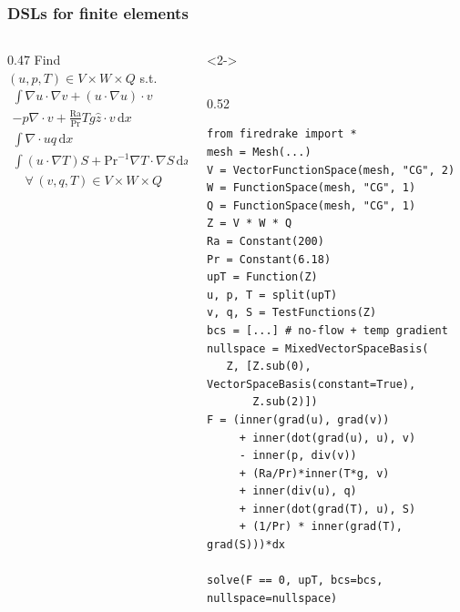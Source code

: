 \documentclass[presentation]{beamer}
\begin{document}
\begin{frame}[fragile]
  \frametitle{DSLs for finite elements}
  \begin{columns}
    \begin{column}{0.47\framewidth}
      {\footnotesize
        Find $(u, p, T) \in V\times W\times Q$ s.t.
        \begin{align*}
          \int\!\nabla u \cdot \nabla v + (u \cdot \nabla u) \cdot v \\
          - p\nabla\cdot v + \frac{\text{Ra}}{\text{Pr}} Tg \hat{z} \cdot v\,\text{d}x &= 0 \\
          \int\!\nabla\cdot u q\,\text{d}x&= 0\\
          \int\! (u\cdot \nabla T) S + \text{Pr}^{-1} \nabla T \cdot \nabla
          S\,\text{d}x &= 0\\
          \quad \forall\, (v,q,T) \in V\times W \times Q
        \end{align*}
        }
    \end{column}
    \begin{uncoverenv}<2->
      \begin{column}{0.52\framewidth}
\begin{verbatim}
from firedrake import *
mesh = Mesh(...)
V = VectorFunctionSpace(mesh, "CG", 2)
W = FunctionSpace(mesh, "CG", 1)
Q = FunctionSpace(mesh, "CG", 1)
Z = V * W * Q
Ra = Constant(200)
Pr = Constant(6.18)
upT = Function(Z)
u, p, T = split(upT)
v, q, S = TestFunctions(Z)
bcs = [...] # no-flow + temp gradient
nullspace = MixedVectorSpaceBasis(
   Z, [Z.sub(0), VectorSpaceBasis(constant=True),
       Z.sub(2)])
F = (inner(grad(u), grad(v))
     + inner(dot(grad(u), u), v)
     - inner(p, div(v))
     + (Ra/Pr)*inner(T*g, v)
     + inner(div(u), q)
     + inner(dot(grad(T), u), S)
     + (1/Pr) * inner(grad(T), grad(S)))*dx

solve(F == 0, upT, bcs=bcs, nullspace=nullspace)
\end{verbatim}
      \end{column}
    \end{uncoverenv}
  \end{columns}
\end{frame}
\end{document}
